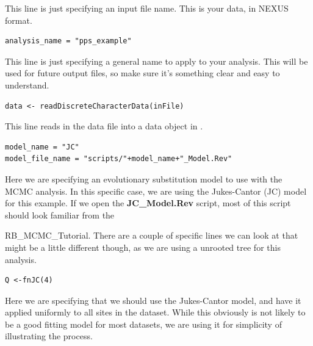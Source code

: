 This line is just specifying an input file name. This is your data, in NEXUS format.

{\tt \begin{snugshade*}
\begin{lstlisting}
analysis_name = "pps_example"
\end{lstlisting}
\end{snugshade*}}

This line is just specifying a general name to apply to your analysis. This will be used for future output files, so make sure it's something clear and easy to understand.

{\tt \begin{snugshade*}
\begin{lstlisting}
data <- readDiscreteCharacterData(inFile)
\end{lstlisting}
\end{snugshade*}}

This line reads in the data file into a data object in \RevBayes. 

 
{\tt \begin{snugshade*}
\begin{lstlisting}
model_name = "JC"
model_file_name = "scripts/"+model_name+"_Model.Rev"
\end{lstlisting}
\end{snugshade*}}

Here we are specifying an evolutionary substitution model to use with the MCMC analysis. In this specific
case, we are using the Jukes-Cantor (JC) model for this example. If we open the \textbf{JC\_Model.Rev} 
script, most of this script should look familiar from the \item RB\_MCMC\_Tutorial. There are a couple of specific 
lines we can look at that might be a little different though, as we are using a unrooted tree for this
analysis. 

{\tt \begin{snugshade*}
\begin{lstlisting}
Q <-fnJC(4)
\end{lstlisting}
\end{snugshade*}}

Here we are specifying that we should use the Jukes-Cantor model, and have it applied uniformly to all sites in 
the dataset. While this obviously is not likely to be a good fitting model for most datasets, we are using it for 
simplicity of illustrating the process. 

